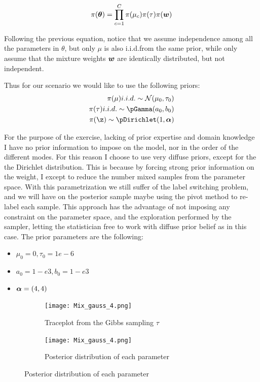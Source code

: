 \documentclass{article}
\newcommand\iid{i.i.d.}
\newcommand\pN{\mathcal{N}}
\begin{document}
\begin{equation}
\pi(\boldsymbol{\theta}) = \prod_{c=1}^C \pi(\mu_c) \pi(\tau) \pi(\boldsymbol{w})  
\end{equation}

Following the previous equation, notice that we assume independence among all the parameters in $\theta$, but only $\mu$ is also \iid from the same prior, while only assume that the mixture weights $\boldsymbol{w}$ are identically distributed, but not independent.

Thus for our scenario we would like to use the following priors:
\begin{align*} 
\pi(\mu) \iid \sim \pN(\mu_0, \tau_0) \\
\pi(\tau) \iid \sim \pGamma(a_0,b_0) \\
\pi(\z) \sim \pDirichlet (1, \vect \alpha)\\
\end{align*}



For the purpose of the exercise, lacking of prior expertise and domain knowledge I have no prior information to impose on the model, nor in the order of the different modes. For this reason I choose to use very diffuse priors, except for the the Dirichlet distribution. This is because by forcing strong prior information on the weight, I except to reduce the number mixed samples from the parameter space.  With this parametrization we still suffer of the label switching problem, and we will have on the posterior sample maybe using the pivot method to re-label each sample. This approach has the advantage of not imposing any constraint on the parameter space, and the exploration performed by the sampler, letting the statistician free to work with diffuse prior belief as in this case. The prior parameters are the following:

\begin{itemize}
\item $\mu_0 = 0, \tau_0 = 1e-6$
\item $a_0 = 1-e3, b_0 = 1-e3$
\item $\boldsymbol{\alpha} = (4,4)$
\end{itemize}


\begin{figure}[h!]
    \begin{subfigure}{0.5\textwidth}
        \texttt{[image: Mix\_gauss\_4.png]}
        \caption{Traceplot from the Gibbs sampling $\tau$}
        \label{Mixture of gaussians}
    \end{subfigure}
    \begin{subfigure}{0.5\textwidth}
        \texttt{[image: Mix\_gauss\_4.png]}
        \caption{Posterior distribution of each parameter}
        \label{Mixture of gaussians}
    \end{subfigure}
\end{figure}
\end{document}
